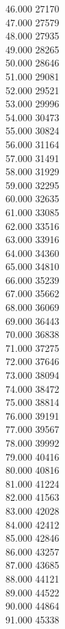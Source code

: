 { 46.000	27170 \\
 47.000	27579 \\
 48.000	27935 \\
 49.000	28265 \\
 50.000	28646 \\
 51.000	29081 \\
 52.000	29521 \\
 53.000	29996 \\
 54.000	30473 \\
 55.000	30824 \\
 56.000	31164 \\
 57.000	31491 \\
 58.000	31929 \\
 59.000	32295 \\
 60.000	32635 \\
 61.000	33085 \\
 62.000	33516 \\
 63.000	33916 \\
 64.000	34360 \\
 65.000	34810 \\
 66.000	35239 \\
 67.000	35662 \\
 68.000	36069 \\
 69.000	36443 \\
 70.000	36838 \\
 71.000	37275 \\
 72.000	37646 \\
 73.000	38094 \\
 74.000	38472 \\
 75.000	38814 \\
 76.000	39191 \\
 77.000	39567 \\
 78.000	39992 \\
 79.000	40416 \\
 80.000	40816 \\
 81.000	41224 \\
 82.000	41563 \\
 83.000	42028 \\
 84.000	42412 \\
 85.000	42846 \\
 86.000	43257 \\
 87.000	43685 \\
 88.000	44121 \\
 89.000	44522 \\
 90.000	44864 \\
 91.000	45338 \\
}
